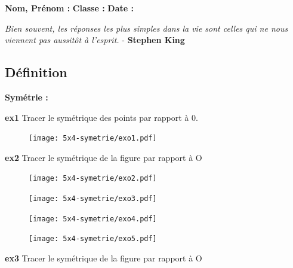 



\textbf{Nom, Prénom :} \hspace{8cm} \textbf{Classe :} \hspace{3cm} \textbf{Date :}\\
\vspace{-0.8cm}
\begin{center}
  \textit{Bien souvent, les réponses les plus simples dans la vie sont celles qui ne nous viennent pas aussitôt à l'esprit.}  - \textbf{Stephen King}
\end{center}
\vspace{-0.8cm}

\subsection*{Définition}

\textbf{Symétrie :} \dotfill \\
\Pointilles[1]

\textbf{ex1} Tracer le symétrique des points par rapport à 0.

\begin{figure}[H]
  \centering
  \texttt{[image: 5x4-symetrie/exo1.pdf]}
\end{figure}

\textbf{ex2} Tracer le symétrique de la figure par rapport à O


\begin{minipage}[t]{0.50\textwidth}
\begin{figure}[H]
  \centering
  \texttt{[image: 5x4-symetrie/exo2.pdf]}
\end{figure}

\begin{figure}[H]
  \centering
  \texttt{[image: 5x4-symetrie/exo3.pdf]}
\end{figure}
\end{minipage}
\begin{minipage}[t]{0.50\textwidth}
\begin{figure}[H]
  \centering
  \texttt{[image: 5x4-symetrie/exo4.pdf]}
\end{figure}

\begin{figure}[H]
  \centering
  \texttt{[image: 5x4-symetrie/exo5.pdf]}
\end{figure}
\end{minipage}

\vspace{0.5cm}
\textbf{ex3} Tracer le symétrique de la figure par rapport à O

